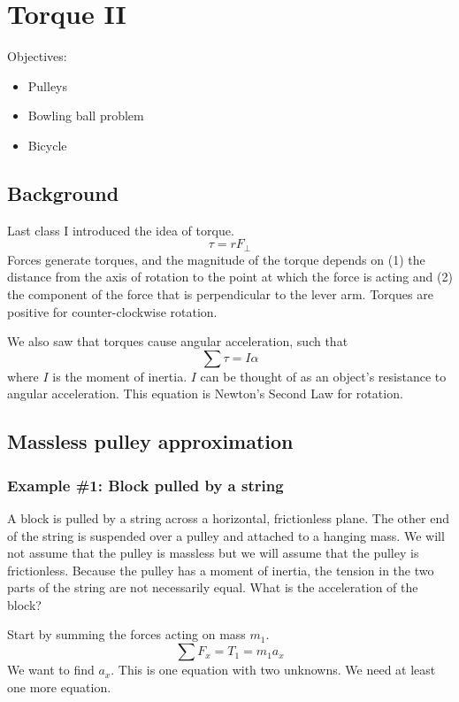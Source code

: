 \section{Torque II}
Objectives:
\begin{itemize}
\item Pulleys
\item Bowling ball problem
\item Bicycle  
\end{itemize}

\subsection{Background}
Last class I introduced the idea of torque.
$$\tau=rF_\perp$$
Forces generate torques, and the magnitude of the torque depends on (1) the distance from the axis of rotation to the point at which the force is acting and (2) the component of the force that is perpendicular to the lever arm. Torques are positive for counter-clockwise rotation.

We also saw that torques cause angular acceleration, such that
$$\sum \tau=I\alpha$$
where $I$ is the moment of inertia. $I$ can be thought of as an object's resistance to angular acceleration. This equation is Newton's Second Law for rotation.

\subsection{Massless pulley approximation}
\subsubsection*{Example \#1: Block pulled by a string}
A block is pulled by a string across a horizontal, frictionless plane. The other end of the string is suspended over a pulley and attached to a hanging mass. We will not assume that the pulley is massless but we will assume that the pulley is frictionless. Because the pulley has a moment of inertia, the tension in the two parts of the string are not necessarily equal. What is the acceleration of the block?

\vspace{8cm}


Start by summing the forces acting on mass $m_1$.
\begin{equation}\sum F_x=T_1=m_1a_x\end{equation}
We want to find $a_x$. 
This is one equation with two unknowns. We need at least one more equation.

